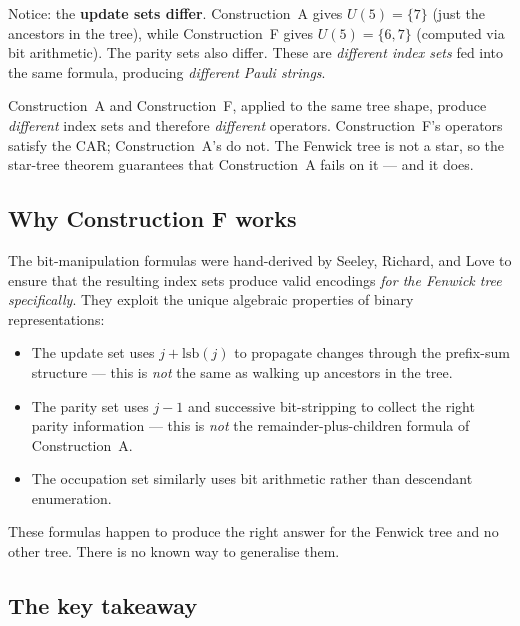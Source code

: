 \documentclass[11pt,a4paper]{article}
\theoremstyle{definition}
\begin{document}
Notice: the \textbf{update sets differ}.  Construction~A gives
$U(5) = \{7\}$ (just the ancestors in the tree), while Construction~F
gives $U(5) = \{6, 7\}$ (computed via bit arithmetic).  The parity
sets also differ.  These are \emph{different index sets} fed into the
same formula, producing \emph{different Pauli strings}.

\begin{keyinsight}
Construction~A and Construction~F, applied to the same tree shape,
produce \emph{different} index sets and therefore \emph{different}
operators.  Construction~F's operators satisfy the CAR;
Construction~A's do not.  The Fenwick tree is not a star, so the
star-tree theorem guarantees that Construction~A fails on it ---
and it does.
\end{keyinsight}

\subsection{Why Construction F works}

The bit-manipulation formulas were hand-derived by Seeley, Richard,
and Love to ensure that the resulting index sets produce valid
encodings \emph{for the Fenwick tree specifically}.  They exploit the
unique algebraic properties of binary representations:
\begin{itemize}
  \item The update set uses $j + \mathrm{lsb}(j)$ to propagate
    changes through the prefix-sum structure --- this is \emph{not}
    the same as walking up ancestors in the tree.
  \item The parity set uses $j - 1$ and successive bit-stripping to
    collect the right parity information --- this is \emph{not} the
    remainder-plus-children formula of Construction~A.
  \item The occupation set similarly uses bit arithmetic rather than
    descendant enumeration.
\end{itemize}

These formulas happen to produce the right answer for the Fenwick
tree and no other tree.  There is no known way to generalise them.

\subsection{The key takeaway}
\end{document}
